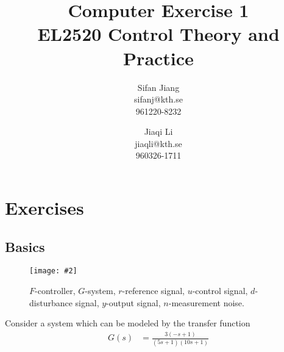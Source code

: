 \documentclass[a4paper,11pt]{article}
\title{
	Computer Exercise 1\\
	EL2520 Control Theory and Practice
}
\author{
	Sifan Jiang\\
	sifanj@kth.se\\
	961220-8232
	\and
	Jiaqi Li\\
	jiaqli@kth.se\\
	960326-1711
}
\newcommand{\image}[3]{
	\begin{figure}[!ht]
		\centering
	    \texttt{[image: \#2]}
		\caption{#3}
		\label{fig:#2}
	\end{figure}
}
\begin{document}
\maketitle

\section{Exercises}
\subsection{Basics}
\image{0.75}{system}{$F$-controller, $G$-system, $r$-reference signal, $u$-control signal, $d$-disturbance signal, $y$-output signal, $n$-measurement noise.}

\par Consider a system which can be modeled by the transfer function
\begin{align*}
	G(s) &= \frac{3(-s+1)}{(5s+1)(10s+1)}
\end{align*}
\end{document}
